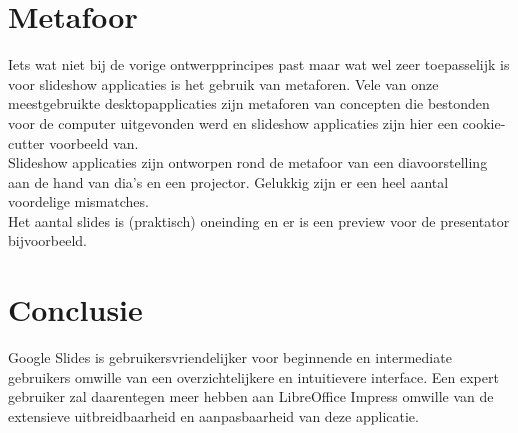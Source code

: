 \documentclass[a4paper]{article}
\begin{document}
\section{Metafoor}
Iets wat niet bij de vorige ontwerpprincipes past maar wat wel zeer toepasselijk is voor slideshow applicaties is het gebruik van metaforen. Vele van onze meestgebruikte desktopapplicaties zijn metaforen van concepten die bestonden voor de computer uitgevonden werd en slideshow applicaties zijn hier een cookie-cutter voorbeeld van.\\
Slideshow applicaties zijn ontworpen rond de metafoor van een diavoorstelling aan de hand van dia's en een projector. Gelukkig zijn er een heel aantal voordelige mismatches.\\ 
Het aantal slides is (praktisch) oneinding en er is een preview voor de presentator bijvoorbeeld.
\section{Conclusie}
Google Slides is gebruikersvriendelijker voor beginnende en intermediate gebruikers omwille van een overzichtelijkere en intuitievere interface. Een expert gebruiker zal daarentegen meer hebben aan LibreOffice Impress omwille van de extensieve uitbreidbaarheid en aanpasbaarheid van deze applicatie. 
\end{document}
